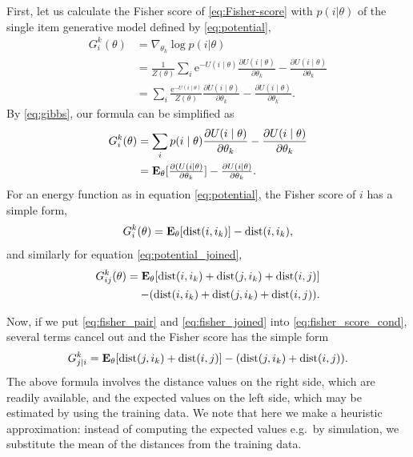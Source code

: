 First, let us calculate the Fisher score of \eqref{eq:Fisher-score} with $p (i|\theta)$ of the single item generative model defined by \eqref{eq:potential}, 
%
\begin{equation}
\begin{split}
    G_i^k(\theta) &=\nabla_{\theta_k} \log p(i|\theta)\\
          &= \frac{1}{Z(\theta)}\sum_{i} \mathrm{e}^{-U(i \mid \theta)} \frac{\partial{U(i \mid \theta)}}{\partial{\theta_k}} - \frac{\partial{U(i \mid \theta)}}{\partial{\theta_k}} \\
          &= \sum_{i} \frac{\mathrm{e}^{-U(i \mid \theta)}}{Z(\theta)} \frac{\partial{U(i \mid \theta)}}{\partial{\theta_k}} - \frac{\partial{U(i \mid \theta)}}{\partial{\theta_k}}.
\end{split}
\nonumber
\end{equation}
%
By \eqref{eq:gibbs}, our formula can be simplified as 
%
\begin{equation}
\begin{split}
    G_i^k(\theta) &= \sum_{i} p(i \mid \theta) \frac{\partial{U(i \mid \theta)}}{\partial{\theta_k}} - \frac{\partial{U(i \mid \theta)}}{\partial{\theta_k}} \\
    				 &= {\textstyle {\bf E_{\theta}}[\frac{\partial{(U(i \mid \theta)}}{\partial{\theta_k}}] - \frac{\partial{U(i \mid \theta)}}{\partial{\theta_k}}.}
\end{split}
\label{eq:gix}
\end{equation}
%
For an energy function as in equation \eqref{eq:potential}, the Fisher score of $i$ has a simple form,
%
\begin{equation}
    G_i^k(\theta)= {\bf E_{\theta}}[\mbox{dist}(i,i_k)] - \mbox{dist}(i,i_k),
\label{eq:fisher_pair}
\end{equation} 
%
and similarly for equation \eqref{eq:potential_joined}, 
%
\begin{equation}
\begin{split}
    G_{ij}^{k}(\theta) = {\bf E_{\theta}}[\mbox{dist}(i,i_k) + \mbox{dist}(j,i_k)+\mbox{dist}(i,j)] \\
    - (\mbox{dist}(i,i_k)+ \mbox{dist}(j,i_k)+\mbox{dist}(i,j)). 
\end{split}
\label{eq:fisher_joined}
\end{equation} 

Now, if we put \eqref{eq:fisher_pair} and \eqref{eq:fisher_joined} into \eqref{eq:fisher_score_cond}, several terms cancel out and the Fisher score has the simple form
%
\begin{equation}
G_{j|i}^k = {\bf E_{\theta}}[\mbox{dist}(j,i_k) + \mbox{dist}(i,j)] - (\mbox{dist}(j,i_k) + \mbox{dist}(i,j)).
\nonumber
\end{equation}
The above formula involves the distance values on the right side, which are readily available, and the expected values on the left side, which may be estimated by using the training data. We note that here we make a heuristic approximation: instead of computing the expected values e.g.\ by simulation, we substitute the mean of the distances from the training data.

